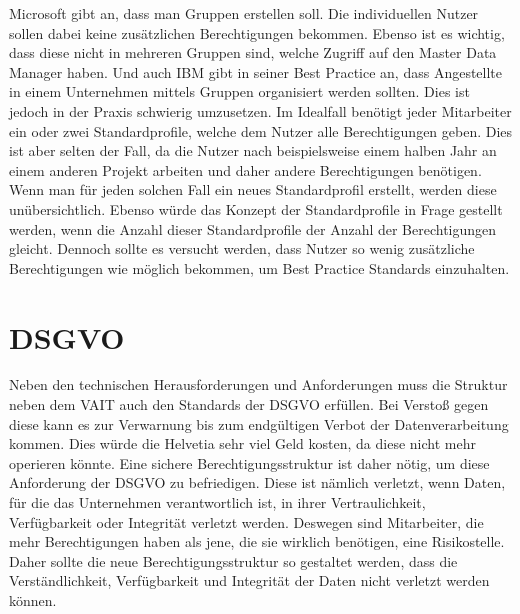 \newline
\newline
Microsoft gibt an, dass man Gruppen erstellen soll.
Die individuellen Nutzer sollen dabei keine zusätzlichen Berechtigungen bekommen.
Ebenso ist es wichtig, dass diese nicht in mehreren Gruppen sind, welche Zugriff auf den Master Data Manager haben.
Und auch IBM gibt in seiner Best Practice an, dass Angestellte in einem Unternehmen mittels Gruppen organisiert werden sollten. \cite{IBMGroup}
\newline
Dies ist jedoch in der Praxis schwierig umzusetzen.
Im Idealfall benötigt jeder Mitarbeiter ein oder zwei Standardprofile, welche dem Nutzer alle Berechtigungen geben.
Dies ist aber selten der Fall, da die Nutzer nach beispielsweise einem halben Jahr an einem anderen Projekt arbeiten und daher andere Berechtigungen benötigen.
Wenn man für jeden solchen Fall ein neues Standardprofil erstellt, werden diese unübersichtlich.
Ebenso würde das Konzept der Standardprofile in Frage gestellt werden, wenn die Anzahl dieser Standardprofile der Anzahl der Berechtigungen gleicht.
Dennoch sollte es versucht werden, dass Nutzer so wenig zusätzliche Berechtigungen wie möglich bekommen, um Best Practice Standards einzuhalten. 

\section{DSGVO}
\label{sec:chapter04:DSGVO}
Neben den technischen Herausforderungen und Anforderungen muss die Struktur neben dem \ac{VAIT} auch den Standards der \ac{DSGVO} erfüllen.
Bei Verstoß gegen diese kann es zur Verwarnung bis zum endgültigen Verbot der Datenverarbeitung kommen. \cite{EuroK}
Dies würde die Helvetia sehr viel Geld kosten, da diese nicht mehr operieren könnte.
\newline
Eine sichere Berechtigungsstruktur ist daher nötig, um diese Anforderung der \ac{DSGVO} zu befriedigen.
Diese ist nämlich verletzt, wenn Daten, für die das Unternehmen verantwortlich ist, in ihrer Vertraulichkeit, Verfügbarkeit oder Integrität verletzt werden.
Deswegen sind Mitarbeiter, die mehr Berechtigungen haben als jene, die sie wirklich benötigen, eine Risikostelle. \cite{EuroW}
\newline
Daher sollte die neue Berechtigungsstruktur so gestaltet werden, dass die Verständlichkeit, Verfügbarkeit und Integrität der Daten nicht verletzt werden können.

